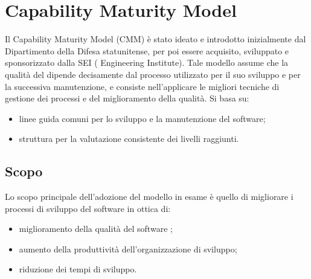 \documentclass[PdQ.tex]{subfiles}
\begin{document}
\hypertarget{\gl{CMM}}{\section{Capability Maturity Model}}
	Il Capability Maturity Model (CMM) è stato ideato e introdotto inizialmente dal Dipartimento della Difesa statunitense, per poi essere acquisito, sviluppato e sponsorizzato dalla SEI ( Engineering Institute). Tale modello
assume che la qualità del  dipende decisamente dal processo utilizzato per il suo sviluppo e per la successiva manutenzione, e consiste nell'applicare le migliori tecniche di gestione dei processi e del miglioramento della qualità. Si basa su:
	\begin{itemize}
		\item linee guida comuni per lo sviluppo e la manutenzione del software;
		\item struttura per la valutazione consistente dei livelli raggiunti.
	\end{itemize}
	
	\subsection{Scopo}
	Lo scopo principale dell'adozione del modello in esame è quello di migliorare i processi di sviluppo del software in ottica di:
	\begin{itemize}
		\item miglioramento della qualità del software ;
		\item aumento della produttività dell'organizzazione di sviluppo;
		\item riduzione dei tempi di sviluppo.
	\end{itemize}
\end{document}
